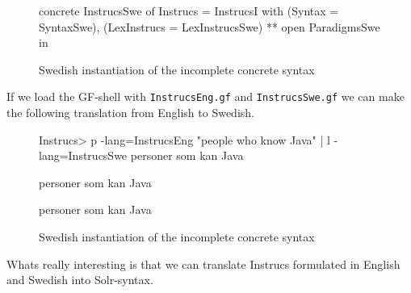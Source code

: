 \begin{figure}[H]
\begin{code}
concrete InstrucsSwe of Instrucs = InstrucsI with 
                                             (Syntax = SyntaxSwe), 
                                             (LexInstrucs = LexInstrucsSwe) 
                                             ** open ParadigmsSwe in {}
\end{code}
\caption{Swedish instantiation of the incomplete concrete syntax}
\end{figure}

If we load the GF-shell with \texttt{InstrucsEng.gf} and \texttt{InstrucsSwe.gf} we can make the following translation from English to Swedish.

\begin{figure}[H]
\begin{code}
Instrucs> p -lang=InstrucsEng "people who know Java" | l -lang=InstrucsSwe
personer som kan Java

personer som kan Java

personer som kan Java

\end{code}
\caption{Swedish instantiation of the incomplete concrete syntax}
\end{figure}

 Whats really interesting is that we can translate Instrucs formulated in English and Swedish into Solr-syntax.